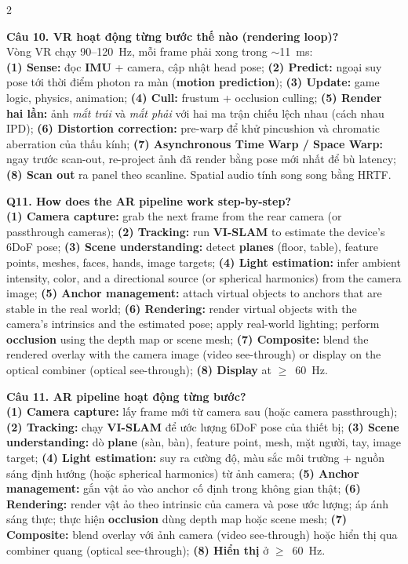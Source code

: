 \begin{paracol}{2}
\switchcolumn

\textbf{Câu 10. VR hoạt động từng bước thế nào (rendering loop)?}\\
Vòng VR chạy 90--120~Hz, mỗi frame phải xong trong $\sim$11~ms:\\
\textbf{(1) Sense:} đọc \textbf{IMU} + camera, cập nhật head pose; \textbf{(2) Predict:} ngoại suy pose tới thời điểm photon ra màn (\textbf{motion prediction}); \textbf{(3) Update:} game logic, physics, animation; \textbf{(4) Cull:} frustum + occlusion culling; \textbf{(5) Render hai lần:} ảnh \textit{mắt trái} và \textit{mắt phải} với hai ma trận chiếu lệch nhau (cách nhau IPD); \textbf{(6) Distortion correction:} pre-warp để khử pincushion và chromatic aberration của thấu kính; \textbf{(7) Asynchronous Time Warp / Space Warp:} ngay trước scan-out, re-project ảnh đã render bằng pose mới nhất để bù latency; \textbf{(8) Scan out} ra panel theo scanline. Spatial audio tính song song bằng HRTF.

\switchcolumn*

\textbf{Q11. How does the AR pipeline work step-by-step?}\\
\textbf{(1) Camera capture:} grab the next frame from the rear camera (or passthrough cameras); \textbf{(2) Tracking:} run \textbf{VI-SLAM} to estimate the device's 6DoF pose; \textbf{(3) Scene understanding:} detect \textbf{planes} (floor, table), feature points, meshes, faces, hands, image targets; \textbf{(4) Light estimation:} infer ambient intensity, color, and a directional source (or spherical harmonics) from the camera image; \textbf{(5) Anchor management:} attach virtual objects to anchors that are stable in the real world; \textbf{(6) Rendering:} render virtual objects with the camera's intrinsics and the estimated pose; apply real-world lighting; perform \textbf{occlusion} using the depth map or scene mesh; \textbf{(7) Composite:} blend the rendered overlay with the camera image (video see-through) or display on the optical combiner (optical see-through); \textbf{(8) Display} at $\geq$~60~Hz.

\switchcolumn

\textbf{Câu 11. AR pipeline hoạt động từng bước?}\\
\textbf{(1) Camera capture:} lấy frame mới từ camera sau (hoặc camera passthrough); \textbf{(2) Tracking:} chạy \textbf{VI-SLAM} để ước lượng 6DoF pose của thiết bị; \textbf{(3) Scene understanding:} dò \textbf{plane} (sàn, bàn), feature point, mesh, mặt người, tay, image target; \textbf{(4) Light estimation:} suy ra cường độ, màu sắc môi trường + nguồn sáng định hướng (hoặc spherical harmonics) từ ảnh camera; \textbf{(5) Anchor management:} gắn vật ảo vào anchor cố định trong không gian thật; \textbf{(6) Rendering:} render vật ảo theo intrinsic của camera và pose ước lượng; áp ánh sáng thực; thực hiện \textbf{occlusion} dùng depth map hoặc scene mesh; \textbf{(7) Composite:} blend overlay với ảnh camera (video see-through) hoặc hiển thị qua combiner quang (optical see-through); \textbf{(8) Hiển thị} ở $\geq$~60~Hz.


\end{paracol}
